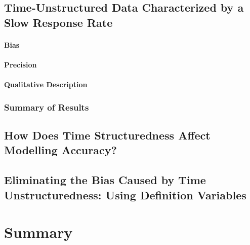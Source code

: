 \documentclass[
12pt, %
twoside,
english]{guelphthesis}
\begin{document}
\hypertarget{time-unstructured-data-characterized-by-a-slow-response-rate}{%
\subsection{Time-Unstructured Data Characterized by a Slow Response Rate}\label{time-unstructured-data-characterized-by-a-slow-response-rate}}

\hypertarget{bias-slow-exp3}{%
\paragraph{Bias}\label{bias-slow-exp3}}

\hypertarget{precision-slow-exp3}{%
\paragraph{Precision}\label{precision-slow-exp3}}

\hypertarget{qualitative-slow-exp3}{%
\paragraph{Qualitative Description}\label{qualitative-slow-exp3}}

\hypertarget{summary-of-results-10}{%
\subsubsection{Summary of Results}\label{summary-of-results-10}}

\hypertarget{how-does-time-structuredness-affect-modelling-accuracy}{%
\subsection{How Does Time Structuredness Affect Modelling Accuracy?}\label{how-does-time-structuredness-affect-modelling-accuracy}}

\hypertarget{def-variables}{%
\subsection{Eliminating the Bias Caused by Time Unstructuredness: Using Definition Variables}\label{def-variables}}

\hypertarget{summary-1}{%
\section{Summary}\label{summary-1}}
\end{document}
